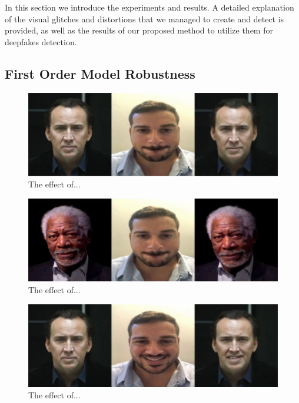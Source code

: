 \documentclass[english,12pt]{article}
\begin{document}
In this section we introduce the experiments and results. A detailed explanation of the
visual glitches and distortions that we managed to create and detect is provided, as well
as the results of our proposed method to utilize them for deepfakes detection.

\subsection{First Order Model Robustness}

\begin{figure}[htb]
  \begin{centering}
      \includegraphics[scale=0.29]{images/‏‏Amit_lips_cage.PNG}
  \par\end{centering}
  \caption{\label{fig:Amit_lips_cage}The effect of...}
\end{figure}

\begin{figure}[htb]
  \begin{centering}
      \includegraphics[scale=0.29]{images/‏‏Amit_lips_freeman.PNG}
  \par\end{centering}
  \caption{\label{fig:Amit_lips_freeman}The effect of...}
\end{figure}

\begin{figure}[htb]
  \begin{centering}
      \includegraphics[scale=0.29]{images/‏‏Amit_smile_cage.PNG}
  \par\end{centering}
  \caption{\label{fig:Amit_smile_cage}The effect of...}
\end{figure}
\end{document}
